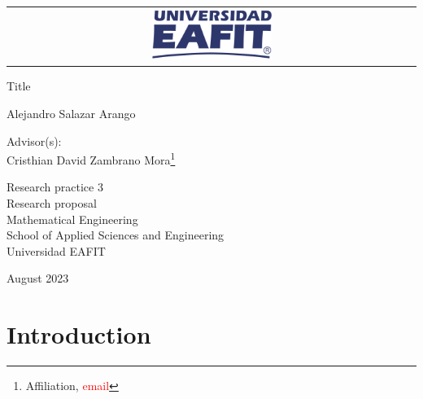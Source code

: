 \documentclass[12pt,letterpaper]{article}
\begin{document}
\begin{titlepage}

\Large
\sffamily

\begin{center}
  \begin{tabular}{c}
    \includegraphics[width=0.30\textwidth]{logo-eafit.png}
  \end{tabular}
\end{center}

\vfill
\begin{center}
  \LARGE Title
\end{center}

\vspace*{1cm}
\centerline{\LARGE Alejandro Salazar Arango\footnotemark}  
\vfill

\begin{center}
Advisor(s): \\
Cristhian David Zambrano Mora\footnote{Affiliation, \textcolor{red}{email}}   \\
\end{center}

\vfill

\begin{center}
  \large
    Research practice 3 \\
  Research proposal \\
  Mathematical Engineering\\
  School of Applied Sciences and Engineering\\
  Universidad EAFIT \\
\end{center}

\vfill
\centerline{August 2023}
\vspace*{0.7cm}
\end{titlepage}


\section{Introduction}

\end{document}
